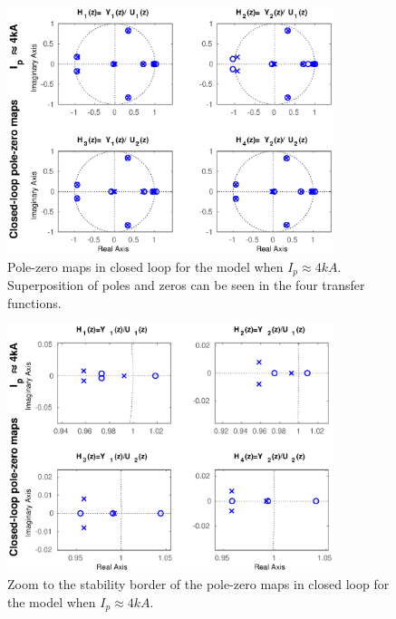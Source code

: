\begin{figure} 
	\centering
	\includegraphics[width=0.85\textwidth]{Chp5/PoleZero/PoleZeroClosePos.eps}
	\caption{Pole-zero maps in closed loop for the model when $I_p\approx 4 kA$. Superposition  of poles and zeros can be seen in the four transfer functions.\label{PoleZeroClosePos}}
\end{figure}	

\begin{figure}
	\centering
	\includegraphics[width=0.85\textwidth]{Chp5/PoleZero/PoleZeroClosePosZoom.eps}
	\caption{Zoom to the stability border of the pole-zero maps in closed loop for the model when $I_p\approx 4 kA$.\label{PoleZeroClosePosZoom}}
\end{figure}
	


